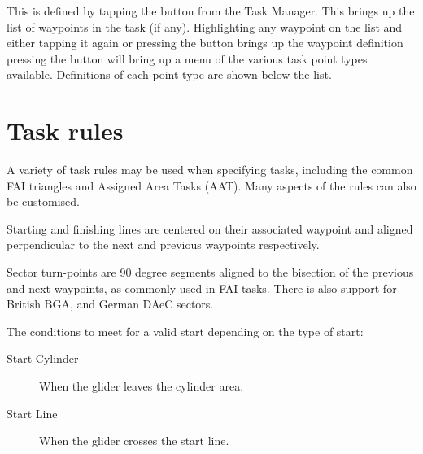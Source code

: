 This is defined by tapping the  button from the Task Manager. 
This brings up the list of waypoints in the task (if any).  Highlighting any waypoint 
on the list and either tapping it again or pressing the  button 
brings up the waypoint definition pressing the  button  will 
bring up a menu of the various task point types available.  Definitions of each 
point type are shown below the list.

\section{Task rules}\label{sec:task-rules}

A variety of task rules may be used when specifying tasks, including
the common FAI triangles and Assigned Area Tasks (AAT).  Many aspects
of the rules can also be customised.

Starting and finishing lines are centered on their associated waypoint
and aligned perpendicular to the next and previous waypoints
respectively.

Sector turn-points are 90 degree segments aligned to the bisection of
the previous and next waypoints, as commonly used in FAI tasks.
There is also support for British BGA, and German DAeC sectors.

The conditions to meet for a valid start depending on the type of start:
\begin{description}
\item[Start Cylinder] When the glider leaves the cylinder area.
\item[Start Line] When the glider crosses the start line.
\end{description}

